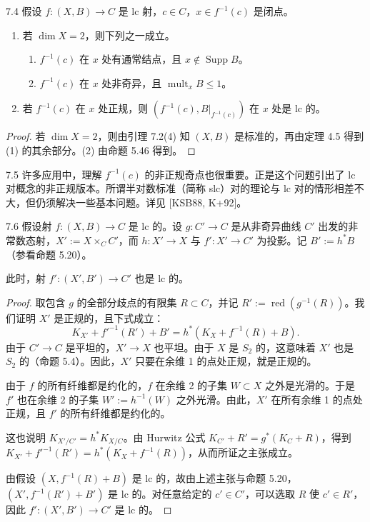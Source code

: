 \begin{lemmap}{7.4}
假设 $f\colon(X,B)\to C$ 是 lc 射，$c\in C$，$x\in f^{-1}(c)$ 是闭点。
\begin{enumerate}[label=(\arabic*),leftmargin=2.4em,itemsep=1pt,topsep=2pt,parsep=0pt]
\item 若 $\dim X=2$，则下列之一成立。
\begin{enumerate}[label=(\alph*),leftmargin=2.2em,itemsep=1pt,topsep=1pt,parsep=0pt]
\item $f^{-1}(c)$ 在 $x$ 处有通常结点，且 $x\notin\operatorname{Supp}B$。
\item $f^{-1}(c)$ 在 $x$ 处非奇异，且 $\operatorname{mult}_xB\le1$。
\end{enumerate}
\item 若 $f^{-1}(c)$ 在 $x$ 处正规，则 $(f^{-1}(c),B|_{f^{-1}(c)})$ 在 $x$ 处是 lc 的。
\end{enumerate}
\end{lemmap}

\begin{proof}
若 $\dim X=2$，则由引理 7.2(4) 知 $(X,B)$ 是标准的，再由定理 4.5 得到 (1) 的其余部分。(2) 由命题 5.46 得到。
\end{proof}

\begin{remark}{7.5}
许多应用中，理解 $f^{-1}(c)$ 的非正规奇点也很重要。正是这个问题引出了 lc 对概念的非正规版本。所谓半对数标准（简称 slc）对的理论与 lc 对的情形相差不大，但仍须解决一些基本问题。详见 [KSB88, K+92]。
\end{remark}

\begin{lemmap}{7.6}
假设射 $f\colon(X,B)\to C$ 是 lc 的。设 $g\colon C'\to C$ 是从非奇异曲线 $C'$ 出发的非常数态射，$X':=X\times_CC'$，而 $h\colon X'\to X$ 与 $f'\colon X'\to C'$ 为投影。记 $B':=h^*B$（参看命题 5.20）。

此时，射 $f'\colon(X',B')\to C'$ 也是 lc 的。
\end{lemmap}

\begin{proof}
取包含 $g$ 的全部分歧点的有限集 $R\subset C$，并记 $R':=\operatorname{red}(g^{-1}(R))$。我们证明 $X'$ 是正规的，且下式成立：
\[
K_{X'}+f'^{-1}(R')+B'=h^*(K_X+f^{-1}(R)+B).
\]
由于 $C'\to C$ 是平坦的，$X'\to X$ 也平坦。由于 $X$ 是 $S_2$ 的，这意味着 $X'$ 也是 $S_2$ 的（命题 5.4）。因此，$X'$ 只要在余维 1 的点处正规，就是正规的。

由于 $f$ 的所有纤维都是约化的，$f$ 在余维 2 的子集 $W\subset X$ 之外是光滑的。于是 $f'$ 也在余维 2 的子集 $W':=h^{-1}(W)$ 之外光滑。由此，$X'$ 在所有余维 1 的点处正规，且 $f'$ 的所有纤维都是约化的。

这也说明 $K_{X'/C'}=h^*K_{X/C}$。由 Hurwitz 公式 $K_{C'}+R'=g^*(K_C+R)$，得到 $K_{X'}+f'^{-1}(R')=h^*(K_X+f^{-1}(R))$，从而所证之主张成立。

由假设 $(X,f^{-1}(R)+B)$ 是 lc 的，故由上述主张与命题 5.20，$(X',f^{-1}(R')+B')$ 是 lc 的。对任意给定的 $c'\in C'$，可以选取 $R$ 使 $c'\in R'$，因此 $f'\colon(X',B')\to C'$ 是 lc 的。
\end{proof}

